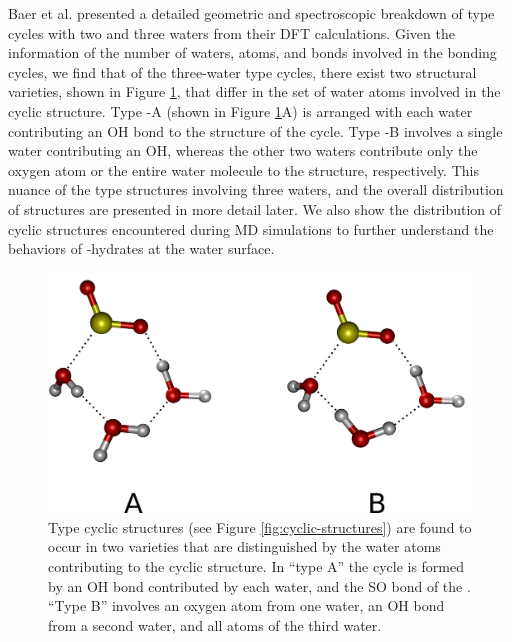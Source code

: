 Baer et al. presented a detailed geometric and spectroscopic breakdown of type  cycles with two and three waters from their DFT calculations.\cite{Baer2010} Given the information of the number of waters, atoms, and bonds involved in the bonding cycles, we find that of the three-water type  cycles, there exist two structural varieties, shown in Figure \ref{fig:type-3-varieties}, that differ in the set of water atoms involved in the cyclic structure. Type -A (shown in Figure \ref{fig:type-3-varieties}A) is arranged with each water contributing an OH bond to the structure of the cycle. Type -B involves a single water contributing an OH, whereas the other two waters contribute only the oxygen atom or the entire water molecule to the structure, respectively. This nuance of the type  structures involving three waters, and the overall distribution of structures are presented in more detail later. We also show the distribution of cyclic structures encountered during MD simulations to further understand the behaviors of \suldiox-hydrates at the water surface.

\begin{figure}[h!]
	\begin{center}
		\includegraphics[scale=1.0]{images/cycles/triple-cycle-types-small.png}
		\caption{Type  cyclic structures (see Figure \ref{fig:cyclic-structures}) are found to occur in two varieties that are distinguished by the water atoms contributing to the cyclic structure. In ``type A'' the cycle is formed by an OH bond contributed by each water, and the SO bond of the \suldiox. ``Type B'' involves an oxygen atom from one water, an OH bond from a second water, and all atoms of the third water.}
		\label{fig:type-3-varieties}
	\end{center}
\end{figure}

